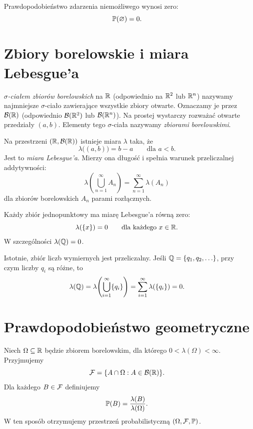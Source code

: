 \begin{fakt}
\label{fakt:pusty}
Prawdopodobieństwo zdarzenia niemożliwego wynosi zero:
\[
  \mathbb{P}(\varnothing)=0.
\]
\end{fakt}

\section{Zbiory borelowskie i miara Lebesgue'a}
\label{sec:borel}

\begin{definicja}
\emph{$\sigma$-ciałem zbiorów borelowskich} na $\mathbb{R}$
(odpowiednio na $\mathbb{R}^2$ lub $\mathbb{R}^n$) nazywamy najmniejsze
$\sigma$-ciało zawierające wszystkie zbiory otwarte.
Oznaczamy je przez $\mathcal{B}(\mathbb{R})$ (odpowiednio $\mathcal{B}(\mathbb{R}^2)$ lub $\mathcal{B}(\mathbb{R}^n)$).
Na prostej wystarczy rozważać otwarte przedziały $(a,b)$.
Elementy tego $\sigma$-ciała nazywamy \emph{zbiorami borelowskimi}.
\end{definicja}

Na przestrzeni $(\mathbb{R},\mathcal{B}(\mathbb{R}))$ istnieje miara $\lambda$ taka, że
\[
  \lambda\bigl((a,b)\bigr)=b-a
  \qquad\text{dla }a<b.
\]
Jest to \emph{miara Lebesgue'a}. Mierzy ona długość i spełnia
warunek przeliczalnej addytywności:
\[
  \lambda\!\left(\bigcup_{n=1}^{\infty}A_n\right)
    =\sum_{n=1}^{\infty}\lambda(A_n)
\]
dla zbiorów borelowskich $A_n$ parami rozłącznych.

\begin{fakt}
\label{fakt:miara-zero}
Każdy zbiór jednopunktowy ma miarę Lebesgue'a równą zero:
\[
  \lambda(\{x\})=0\qquad\text{dla każdego }x\in\mathbb{R}.
\]
W szczególności $\lambda(\mathbb{Q})=0$.
\end{fakt}

Istotnie, zbiór liczb wymiernych jest przeliczalny. Jeśli
$\mathbb{Q}=\{q_1,q_2,\ldots\}$, przy czym liczby $q_i$ są różne, to
\[
  \lambda(\mathbb{Q})
    =\lambda\!\left(\bigcup_{i=1}^{\infty}\{q_i\}\right)
    =\sum_{i=1}^{\infty}\lambda(\{q_i\})
    =0.
\]

\section{Prawdopodobieństwo geometryczne}
\label{sec:geometryczne}

Niech $\Omega\subseteq\mathbb{R}$ będzie zbiorem borelowskim, dla którego
$0<\lambda(\Omega)<\infty$. Przyjmujemy
\[
  \mathcal{F}=\{A\cap\Omega:A\in\mathcal{B}(\mathbb{R})\}.
\]
Dla każdego $B\in\mathcal{F}$ definiujemy
\begin{equation}
  \mathbb{P}(B)=\frac{\lambda(B)}{\lambda(\Omega)}.
  \label{eq:geometryczne}
\end{equation}
W ten sposób otrzymujemy przestrzeń probabilistyczną
$(\Omega,\mathcal{F},\mathbb{P})$.

